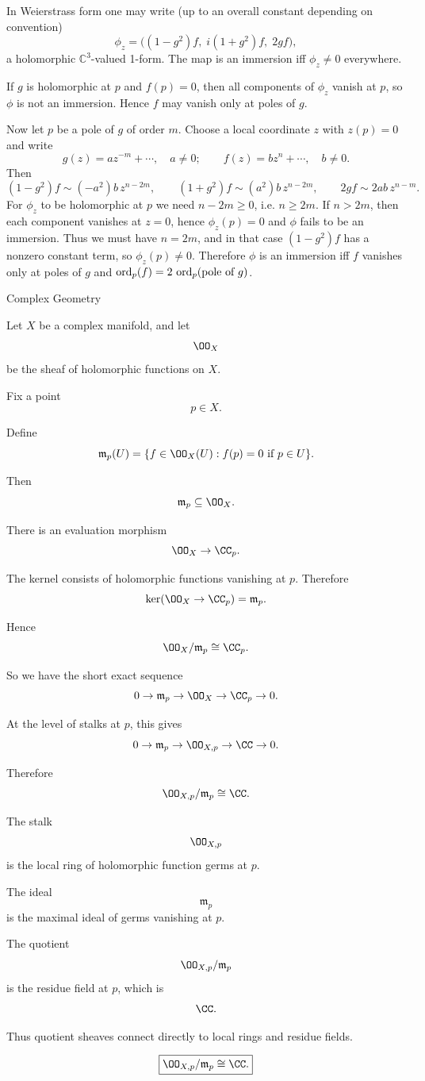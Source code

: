 

\begin{solution}
In Weierstrass form one may write (up to an overall constant depending on convention)
	\[
	\phi_z = \big((1-g^2)f,\; i(1+g^2)f,\; 2gf\big),
	\]
	a holomorphic $\mathbb C^3$-valued 1-form. The map is an immersion iff $\phi_z\neq 0$ everywhere.

	If $g$ is holomorphic at $p$ and $f(p)=0$, then all components of $\phi_z$ vanish at $p$, so $\phi$ is not an
	immersion. Hence $f$ may vanish only at poles of $g$.

	Now let $p$ be a pole of $g$ of order $m$. Choose a local coordinate $z$ with $z(p)=0$ and write
	\[
	g(z)=a z^{-m}+\cdots,\quad a\neq 0;\qquad f(z)=b z^{n}+\cdots,\quad b\neq 0.
	\]
	Then
	\[
	(1-g^2)f \sim (-a^2)b\,z^{n-2m},\qquad (1+g^2)f\sim (a^2)b\,z^{n-2m},\qquad 2gf\sim 2ab\,z^{n-m}.
	\]
	For $\phi_z$ to be holomorphic at $p$ we need $n-2m\ge 0$, i.e. $n\ge 2m$.
	If $n>2m$, then each component vanishes at $z=0$, hence $\phi_z(p)=0$ and $\phi$ fails to be an immersion.
	Thus we must have $n=2m$, and in that case $(1-g^2)f$ has a nonzero constant term, so $\phi_z(p)\neq 0$.
	Therefore $\phi$ is an immersion iff $f$ vanishes only at poles of $g$ and $\operatorname{ord}_p(f)=2\,\operatorname{ord}_p(\text{pole of }g)$.
\end{solution}

\begin{problem}[CP-IV-0047]
\label{prob:cp-iv-0047}
Complex Geometry

Let \(X\) be a complex manifold, and let
\[
\OO_X
\]
be the sheaf of holomorphic functions on \(X\).

Fix a point
\[
p\in X.
\]

Define
\[
\mathfrak m_p(U)
=
\{f\in \OO_X(U): f(p)=0 \text{ if }p\in U\}.
\]

Then
\[
\mathfrak m_p\subseteq \OO_X.
\]

There is an evaluation morphism
\[
\OO_X\to \CC_p.
\]

The kernel consists of holomorphic functions vanishing at \(p\). Therefore
\[
\ker(\OO_X\to \CC_p)=\mathfrak m_p.
\]

Hence
\[
\OO_X/\mathfrak m_p\cong \CC_p.
\]

So we have the short exact sequence
\[
0\to \mathfrak m_p
\to \OO_X
\to \CC_p
\to 0.
\]

At the level of stalks at \(p\), this gives
\[
0\to \mathfrak m_p
\to \OO_{X,p}
\to \CC
\to 0.
\]

Therefore
\[
\OO_{X,p}/\mathfrak m_p\cong \CC.
\]

The stalk
\[
\OO_{X,p}
\]
is the local ring of holomorphic function germs at \(p\).

The ideal
\[
\mathfrak m_p
\]
is the maximal ideal of germs vanishing at \(p\).

The quotient
\[
\OO_{X,p}/\mathfrak m_p
\]
is the residue field at \(p\), which is
\[
\CC.
\]

Thus quotient sheaves connect directly to local rings and residue fields.

\[
\boxed{
	\OO_{X,p}/\mathfrak m_p\cong \CC.
}\]
\end{problem}

